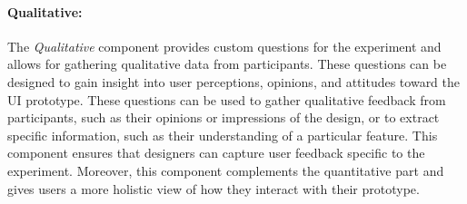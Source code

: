 \paragraph{Qualitative:}
The \textit{Qualitative} component provides custom questions for the experiment and allows for gathering qualitative data from participants. 
These questions can be designed to gain insight into user perceptions, opinions, and attitudes toward the UI prototype.
These questions can be used to gather qualitative feedback from participants, such as their opinions or impressions of the design, or to extract specific information, such as their understanding of a particular feature. 
This component ensures that designers can capture user feedback specific to the experiment.
Moreover, this component complements the quantitative part and gives users a more holistic view of how they interact with their prototype.


